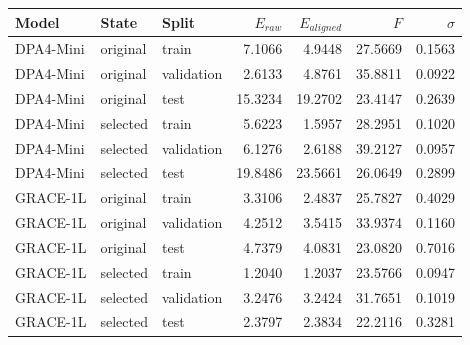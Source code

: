 \begin{center}
\small
\begin{tabular}{lllrrrr}
\toprule
Model & State & Split & $E_{raw}$ & $E_{aligned}$ & $F$ & $\sigma$\\
\midrule
DPA4-Mini & original & train & 7.1066 & 4.9448 & 27.5669 & 0.1563\\
DPA4-Mini & original & validation & 2.6133 & 4.8761 & 35.8811 & 0.0922\\
DPA4-Mini & original & test & 15.3234 & 19.2702 & 23.4147 & 0.2639\\
DPA4-Mini & selected & train & 5.6223 & 1.5957 & 28.2951 & 0.1020\\
DPA4-Mini & selected & validation & 6.1276 & 2.6188 & 39.2127 & 0.0957\\
DPA4-Mini & selected & test & 19.8486 & 23.5661 & 26.0649 & 0.2899\\
\midrule
GRACE-1L & original & train & 3.3106 & 2.4837 & 25.7827 & 0.4029\\
GRACE-1L & original & validation & 4.2512 & 3.5415 & 33.9374 & 0.1160\\
GRACE-1L & original & test & 4.7379 & 4.0831 & 23.0820 & 0.7016\\
GRACE-1L & selected & train & 1.2040 & 1.2037 & 23.5766 & 0.0947\\
GRACE-1L & selected & validation & 3.2476 & 3.2424 & 31.7651 & 0.1019\\
GRACE-1L & selected & test & 2.3797 & 2.3834 & 22.2116 & 0.3281\\
\bottomrule
\end{tabular}
\end{center}
